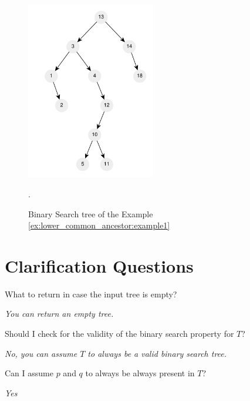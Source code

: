 \begin{figure}
	\centering
	\includegraphics[width=0.5\textwidth]{sources/lowest_common_ancestor/images/example1}
	\caption[Sample short cpation]{Binary Search tree of the Example
	\ref{ex:lower_common_ancestor:example1}}.
	\label{fig:lowest_common_ancestor:example1}
\end{figure}

\section{Clarification Questions}

\begin{QandA}
	\item What to return in case the input tree is empty?
	\begin{answered}
		\textit{You can return an empty tree.}
	\end{answered}


	\item Should I check for the validity of the binary search property for $T$?
	\begin{answered}
		\textit{No, you can assume $T$ to always be a valid binary search tree.}
	\end{answered}

	\item Can I assume $p$ and $q$ to always be always present in $T$?
	\begin{answered}
		\textit{Yes}
	\end{answered}

	
\end{QandA}

